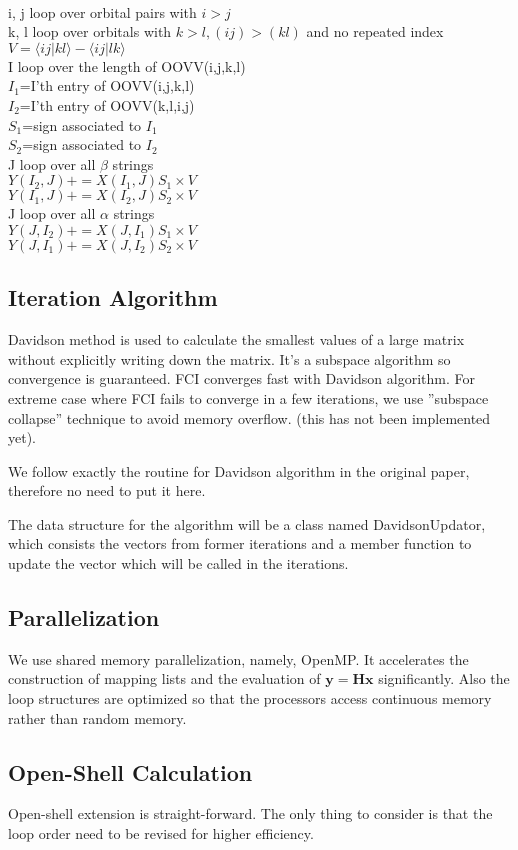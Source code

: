 \documentclass[twocolumn]{article}
\begin{document}
\\
i, j loop over orbital pairs with $i>j$\\
\indent k, l loop over orbitals with $k>l,(ij)>(kl)$ and no repeated index\\
\indent\indent $V=\langle ij|kl\rangle -\langle ij|lk\rangle $\\
\indent\indent I loop over the length of OOVV(i,j,k,l)\\
\indent\indent\indent $I_1$=I'th entry of OOVV(i,j,k,l)\\
\indent\indent\indent $I_2$=I'th entry of OOVV(k,l,i,j)\\
\indent\indent\indent $S_1$=sign associated to $I_1$\\
\indent\indent\indent $S_2$=sign associated to $I_2$\\
\indent\indent\indent J loop over all $\beta$ strings\\
\indent\indent\indent\indent $Y(I_2,J)+=X(I_1,J)S_1\times V$\\
\indent\indent\indent\indent $Y(I_1,J)+=X(I_2,J)S_2\times V$\\
\indent\indent\indent J loop over all $\alpha$ strings\\
\indent\indent\indent\indent $Y(J,I_2)+=X(J,I_1)S_1\times V$\\
\indent\indent\indent\indent $Y(J,I_1)+=X(J,I_2)S_2\times V$\\
\subsection{Iteration Algorithm}
Davidson method is used to calculate the smallest values of a large matrix without explicitly writing down the matrix. It's a subspace algorithm so convergence is guaranteed. FCI converges fast with Davidson algorithm. For extreme case where FCI fails to converge in a few iterations, we use ''subspace collapse'' technique to avoid memory overflow. (this has not been implemented yet).

We follow exactly the routine for Davidson algorithm in the original paper, therefore no need to put it here.

The data structure for the algorithm will be a class named DavidsonUpdator, which consists the vectors from former iterations and a member function to update the vector which will be called in the iterations.
\subsection{Parallelization}
We use shared memory parallelization, namely, OpenMP. It accelerates the construction of mapping lists and the evaluation of $\mathbf{y=Hx}$ significantly. Also the loop structures are optimized so that the processors access continuous memory rather than random memory.
\subsection{Open-Shell Calculation}
Open-shell extension is straight-forward. The only thing to consider is that the loop order need to be revised for higher efficiency.


\end{document}
